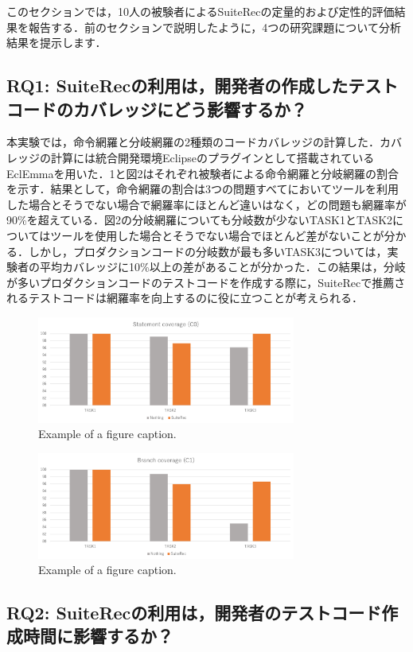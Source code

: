 \documentclass[conference]{IEEEtran}
\begin{document}
このセクションでは，10人の被験者によるSuiteRecの定量的および定性的評価結果を報告する．前のセクションで説明したように，4つの研究課題について分析結果を提示します．

\subsection{RQ1: SuiteRecの利用は，開発者の作成したテストコードのカバレッジにどう影響するか？}
本実験では，命令網羅と分岐網羅の2種類のコードカバレッジの計算した．カバレッジの計算には統合開発環境Eclipseのプラグインとして搭載されているEclEmmaを用いた．1と図2はそれぞれ被験者による命令網羅と分岐網羅の割合を示す．結果として，命令網羅の割合は3つの問題すべてにおいてツールを利用した場合とそうでない場合で網羅率にほとんど違いはなく，どの問題も網羅率が90\%を超えている．図2の分岐網羅についても分岐数が少ないTASK1とTASK2についてはツールを使用した場合とそうでない場合でほとんど差がないことが分かる．しかし，プロダクションコードの分岐数が最も多いTASK3については，実験者の平均カバレッジに10\%以上の差があることが分かった．この結果は，分岐が多いプロダクションコードのテストコードを作成する際に，SuiteRecで推薦されるテストコードは網羅率を向上するのに役に立つことが考えられる．
\begin{figure}[htbp]
\centerline{\includegraphics[width=8.5cm]{C0.pdf}}
\caption{Example of a figure caption.}
\label{fig}
\end{figure}

\begin{figure}[htbp]
\centerline{\includegraphics[width=8.5cm]{C1.pdf}}
\caption{Example of a figure caption.}
\label{fig}
\end{figure}

\subsection{RQ2: SuiteRecの利用は，開発者のテストコード作成時間に影響するか？}
\end{document}
